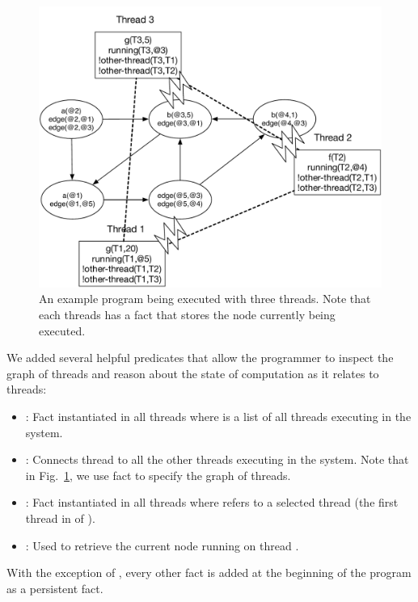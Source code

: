 \begin{figure}[ht]
   \includegraphics[width=0.6\linewidth]{figures/threads/threads.pdf}

   \caption{An example program being executed with three threads. Note that each
      threads has a  fact that stores the node currently being
   executed.}

   \label{fig:coord:thread_facts}
\end{figure}

We added several helpful predicates that allow the programmer to inspect the
graph of threads and reason about the state of computation as it relates to
threads:

\begin{itemize}
   \item {}: Fact instantiated in all threads where
       is a list of all threads executing in the system.

   \item {}: Connects thread  to all the
      other threads  executing in the system. Note that in
      Fig.~\ref{fig:coord:thread_facts}, we use  fact
      to specify the graph of threads.


   \item {}: Fact instantiated in all
      threads where  refers to a selected thread (the first thread
      in  of ).

   \item {}: Used to retrieve the current node 
      running on thread .
\end{itemize}

With the exception of , every other fact is added at the beginning
of the program as a persistent fact.


